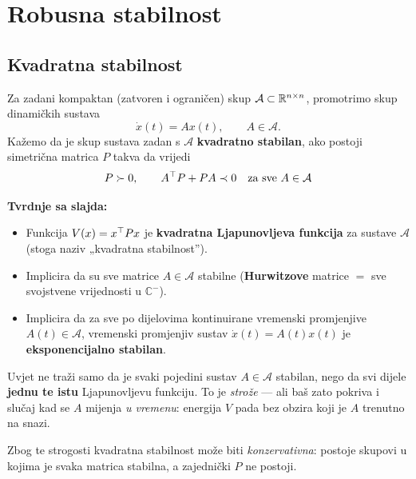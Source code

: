 \section{Robusna stabilnost}
\label{sec:robusna-stabilnost}

\subsection{Kvadratna stabilnost}

\begin{definicija}
Za zadani kompaktan (zatvoren i ograničen) skup
$\mathcal{A} \subset \mathbb{R}^{n\times n}$, promotrimo skup dinamičkih sustava
\[
\dot x(t) = Ax(t), \qquad A \in \mathcal{A}.
\]
Kažemo da je skup sustava zadan s $\mathcal{A}$ \textbf{kvadratno stabilan},
ako postoji simetrična matrica $P$ takva da vrijedi
\begin{equation}
\label{eq:kvadratna-stabilnost}
P \succ 0, \qquad A^{\top} P + PA \prec 0 \quad\text{za sve } A \in \mathcal{A}
\end{equation}
\end{definicija}

\textbf{Tvrdnje sa slajda:}

\begin{itemize}
  \item Funkcija $V(x) = x^{\top} Px$ je \textbf{kvadratna Ljapunovljeva funkcija}
        za sustave $\mathcal{A}$ (stoga naziv „kvadratna stabilnost”).
  \item Implicira da su sve matrice $A \in \mathcal{A}$ stabilne
        (\textbf{Hurwitzove} matrice $=$ sve svojstvene vrijednosti u
        $\mathbb{C}^-$).
  \item Implicira da za sve po dijelovima kontinuirane vremenski promjenjive
        $A(t) \in \mathcal{A}$, vremenski promjenjiv sustav
        $\dot x(t) = A(t)x(t)$ je \textbf{eksponencijalno stabilan}.
\end{itemize}

\begin{napomena}
Uvjet ne traži samo da je svaki pojedini sustav $A \in \mathcal{A}$ stabilan,
nego da svi dijele \textbf{jednu te istu} Ljapunovljevu funkciju. To je
\emph{strože} --- ali baš zato pokriva i slučaj kad se $A$ mijenja \emph{u
vremenu}: energija $V$ pada bez obzira koji je $A$ trenutno na snazi.

Zbog te strogosti kvadratna stabilnost može biti \emph{konzervativna}: postoje
skupovi u kojima je svaka matrica stabilna, a zajednički $P$ ne postoji.
\end{napomena}

